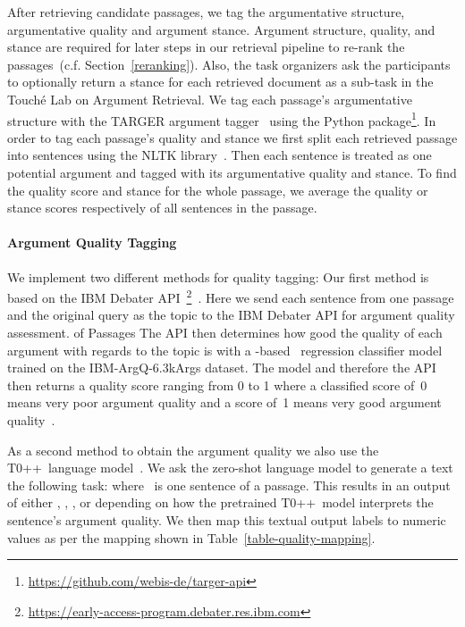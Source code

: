 After retrieving candidate passages, we tag the argumentative structure, argumentative quality and argument stance.
Argument structure, quality, and stance are required for later steps in our retrieval pipeline to re-rank the passages~(c.f. Section~\ref{reranking}).
Also, the task organizers ask the participants to optionally return a stance for each retrieved document as a sub-task in the Touché Lab on Argument Retrieval.
We tag each passage's argumentative structure with the TARGER argument tagger~\cite{ChernodubOHBHBP2019} using the  Python package\footnote{\url{https://github.com/webis-de/targer-api}}.
In order to tag each passage's quality and stance we first split each retrieved passage into sentences using the NLTK library~\cite{BirdLK2009}.
Then each sentence is treated as one potential argument and tagged with its argumentative quality and stance.
To find the quality score and stance for the whole passage, we average the quality or stance scores respectively of all sentences in the passage.

\paragraph{Argument Quality Tagging}


We implement two different methods for quality tagging:
Our first method is based on the IBM Debater API~\footnote{\url{https://early-access-program.debater.res.ibm.com}}~\cite{ToledoGCFVLJAS2019}.
Here we send each sentence from one passage and the original query as the topic to the IBM Debater API for argument quality assessment. of Passages
The API then determines how good the quality of each argument with regards to the topic is with a \Bert-based~\cite{DevlinCLT2019} regression classifier model trained on the IBM-ArgQ-6.3kArgs dataset. The model and therefore the API then returns a quality score ranging from 0 to 1 where a classified score of~0 means very poor argument quality and a score of~1 means very good argument quality~\cite{ToledoGCFVLJAS2019}.

As a second method to obtain the argument quality we also use the T0++~language model~\cite{SanhWRBSACSLRDBXTSSKCNDCJWMSYPBWNRSSFFTBGBWR2021}.
We ask the zero-shot language model to generate a text the following task: \hspace{1.5em}  where ~is one sentence of a passage.
This results in an output of either , , , or  depending on how the pretrained T0++~model interprets the sentence's argument quality.
We then map this textual output labels to numeric values as per the mapping shown in Table~\ref{table-quality-mapping}.

